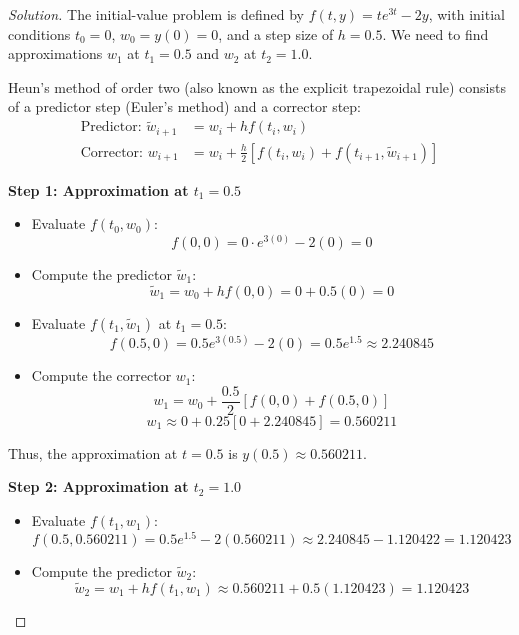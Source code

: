 \documentclass[11pt, a4paper]{article}
\newif\ifsolutionnewpage
\newenvironment{solution}
  {\begin{proof}[Solution]}
  {\end{proof}\ifsolutionnewpage\newpage\fi}
\begin{document}
    \begin{solution}
    The initial-value problem is defined by $f(t, y) = te^{3t} - 2y$, with initial conditions $t_0 = 0$, $w_0 = y(0) = 0$, and a step size of $h = 0.5$.
    We need to find approximations $w_1$ at $t_1 = 0.5$ and $w_2$ at $t_2 = 1.0$.
    
    Heun's method of order two (also known as the explicit trapezoidal rule) consists of a predictor step (Euler's method) and a corrector step:
    \begin{align*}
    \text{Predictor: } \tilde{w}_{i+1} &= w_i + h f(t_i, w_i) \\
    \text{Corrector: } w_{i+1} &= w_i + \frac{h}{2} \left[ f(t_i, w_i) + f(t_{i+1}, \tilde{w}_{i+1}) \right]
    \end{align*}
    
    \vspace{0.3cm}
    \textbf{Step 1: Approximation at $t_1 = 0.5$}
    \begin{itemize}
        \item Evaluate $f(t_0, w_0)$:
        $$ f(0, 0) = 0 \cdot e^{3(0)} - 2(0) = 0 $$
    
        \item Compute the predictor $\tilde{w}_1$:
        $$ \tilde{w}_1 = w_0 + h f(0, 0) = 0 + 0.5(0) = 0 $$
    
        \item Evaluate $f(t_1, \tilde{w}_1)$ at $t_1 = 0.5$:
        $$ f(0.5, 0) = 0.5 e^{3(0.5)} - 2(0) = 0.5 e^{1.5} \approx 2.240845 $$
    
        \item Compute the corrector $w_1$:
        $$ w_1 = w_0 + \frac{0.5}{2} [ f(0, 0) + f(0.5, 0) ] $$
        $$ w_1 \approx 0 + 0.25 [ 0 + 2.240845 ] = \mathbf{0.560211} $$
    \end{itemize}
    Thus, the approximation at $t = 0.5$ is $y(0.5) \approx 0.560211$.
    
    \vspace{0.3cm}
    \textbf{Step 2: Approximation at $t_2 = 1.0$}
    \begin{itemize}
        \item Evaluate $f(t_1, w_1)$:
        $$ f(0.5, 0.560211) = 0.5 e^{1.5} - 2(0.560211) \approx 2.240845 - 1.120422 = 1.120423 $$
    
        \item Compute the predictor $\tilde{w}_2$:
        $$ \tilde{w}_2 = w_1 + h f(t_1, w_1) \approx 0.560211 + 0.5(1.120423) = 1.120423 $$
    

\end{itemize}
\end{solution}
\end{document}
